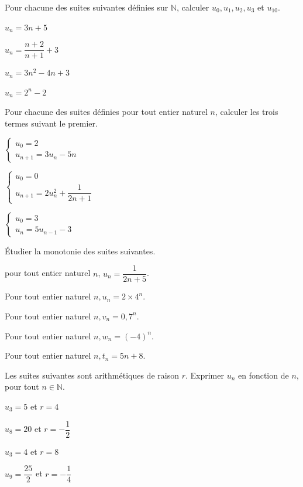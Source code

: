 \documentclass[12pt,a4paper]{article}  %
\begin{document}
Pour chacune des suites suivantes définies sur $\mathbb{N}$, calculer $u_{0}, u_{1}, u_{2}, u_{3}$ et $u_{10}$.
\begin{enumMet}
    \item {} $u_{n}=3 n+5$
    \item $u_{n}=\dfrac{n+2}{n+1}+3$
    \item $u_{n}=3n^{2}-4 n+3$
    \item $u_{n}=2^{n}-2$
\end{enumMet}  

Pour chacune des suites définies pour tout entier naturel $n$, calculer les trois termes suivant le premier.
\begin{enumMet}
    \item $\left\{\begin{array}{l}u_{0}=2 \\ u_{n+1}=3u_{n}-5 n\end{array}\right.$
    \item $\left\{\begin{array}{l}u_{0}=0 \\ u_{n+1}=2u_{n}^{2}+\dfrac{1}{2 n+1}\end{array}\right.$
    \item {} $\left\{\begin{array}{l}u_{0}=3 \\ u_{n}=5 u_{n-1}-3\end{array}\right.$
\end{enumMet}

Étudier la monotonie des suites suivantes.
\begin{enumMet}
    \item pour tout entier naturel $n$, $u_{n}=\dfrac{1}{2 n+5}$.
    \item Pour tout entier naturel $n, u_{n}=2\times4^{n}$.
    \item Pour tout entier naturel $n, v_{n}=0,7^{n}$.
    \item Pour tout entier naturel $n, w_{n}=(-4)^{n}$.
    \item {} Pour tout entier naturel $n, t_{n}=5 n+8$.
\end{enumMet}

Les suites suivantes sont arithmétiques de raison $r$. Exprimer $u_{n}$ en fonction de $n$, pour tout $n \in \mathbb{N}$.
\begin{enumMet}
    \item $u_{3}=5$ et $r=4$
    \item $u_{8}=20$ et $r=-\dfrac{1}{2}$
    \item {} $u_{3}=4$ et $r=8$
    \item $u_{9}=\dfrac{25}{2}$ et $r=-\dfrac{1}{4}$
\end{enumMet}
\end{document}
